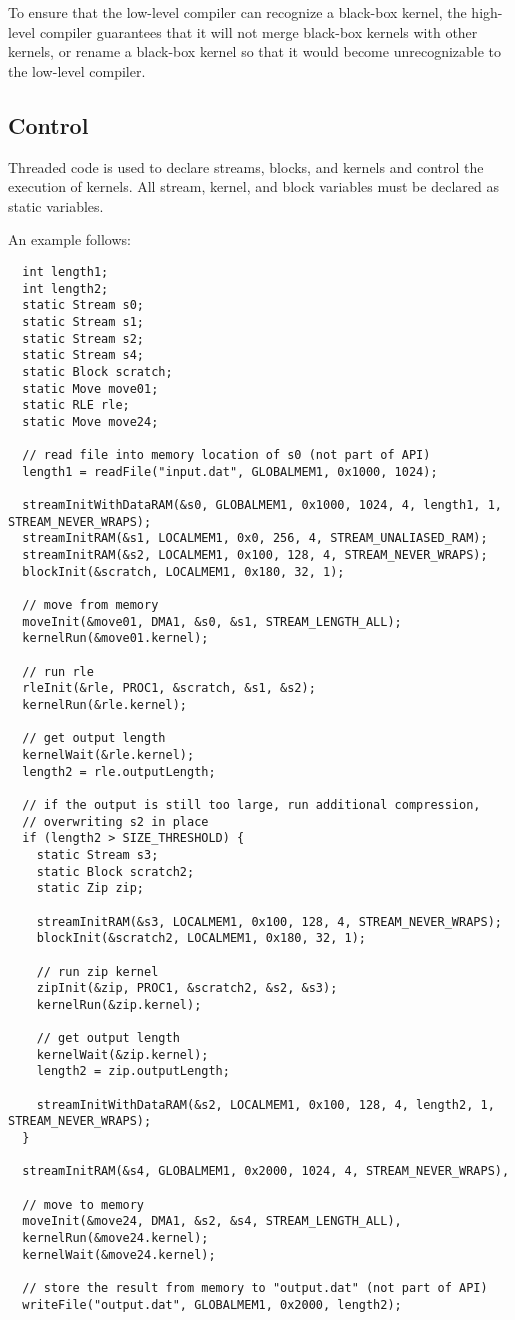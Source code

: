 To ensure that the low-level compiler can recognize a black-box
kernel, the high-level compiler guarantees that it will not merge
black-box kernels with other kernels, or rename a black-box kernel so
that it would become unrecognizable to the low-level compiler.

\subsection{Control}
\label{sec:control}

Threaded code is used to declare streams, blocks, and kernels and
control the execution of kernels. All stream, kernel, and block
variables must be declared as static variables.

An example follows:
{\small
\begin{verbatim}
  int length1;
  int length2;
  static Stream s0;
  static Stream s1;
  static Stream s2;
  static Stream s4;
  static Block scratch;
  static Move move01;
  static RLE rle;
  static Move move24;

  // read file into memory location of s0 (not part of API)
  length1 = readFile("input.dat", GLOBALMEM1, 0x1000, 1024);

  streamInitWithDataRAM(&s0, GLOBALMEM1, 0x1000, 1024, 4, length1, 1, STREAM_NEVER_WRAPS);
  streamInitRAM(&s1, LOCALMEM1, 0x0, 256, 4, STREAM_UNALIASED_RAM);
  streamInitRAM(&s2, LOCALMEM1, 0x100, 128, 4, STREAM_NEVER_WRAPS);
  blockInit(&scratch, LOCALMEM1, 0x180, 32, 1);

  // move from memory
  moveInit(&move01, DMA1, &s0, &s1, STREAM_LENGTH_ALL);
  kernelRun(&move01.kernel);
  
  // run rle
  rleInit(&rle, PROC1, &scratch, &s1, &s2);
  kernelRun(&rle.kernel);

  // get output length
  kernelWait(&rle.kernel);
  length2 = rle.outputLength;
  
  // if the output is still too large, run additional compression, 
  // overwriting s2 in place
  if (length2 > SIZE_THRESHOLD) {
    static Stream s3;
    static Block scratch2;
    static Zip zip;

    streamInitRAM(&s3, LOCALMEM1, 0x100, 128, 4, STREAM_NEVER_WRAPS);
    blockInit(&scratch2, LOCALMEM1, 0x180, 32, 1);

    // run zip kernel
    zipInit(&zip, PROC1, &scratch2, &s2, &s3);
    kernelRun(&zip.kernel);
    
    // get output length
    kernelWait(&zip.kernel);
    length2 = zip.outputLength;

    streamInitWithDataRAM(&s2, LOCALMEM1, 0x100, 128, 4, length2, 1, STREAM_NEVER_WRAPS);
  }
  
  streamInitRAM(&s4, GLOBALMEM1, 0x2000, 1024, 4, STREAM_NEVER_WRAPS),
  
  // move to memory
  moveInit(&move24, DMA1, &s2, &s4, STREAM_LENGTH_ALL),
  kernelRun(&move24.kernel);
  kernelWait(&move24.kernel);

  // store the result from memory to "output.dat" (not part of API)
  writeFile("output.dat", GLOBALMEM1, 0x2000, length2); \end{verbatim}}


